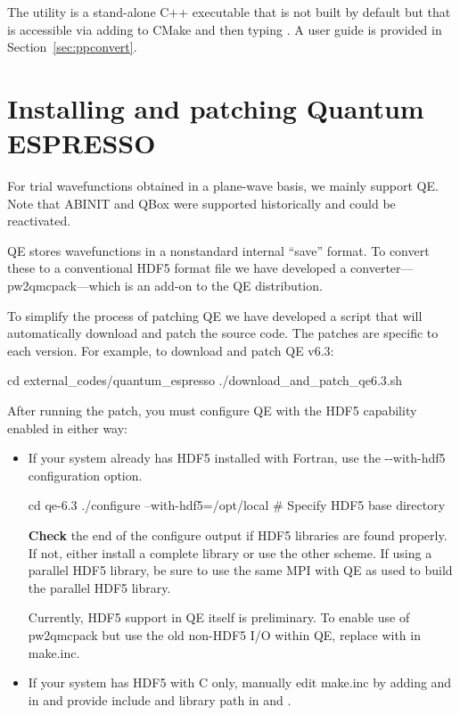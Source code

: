 The utility is a stand-alone C++ executable that is not built by default but that is accessible via adding
 to CMake and then typing .
A user guide is provided in Section~\ref{sec:ppconvert}.

\section{Installing and patching Quantum ESPRESSO}
\label{sec:buildqe}
For trial wavefunctions obtained in a plane-wave basis, we mainly
support QE. Note that ABINIT and QBox were supported historically
and could be reactivated.

QE stores wavefunctions in a nonstandard internal
``save'' format. To convert these to a conventional HDF5 format file
we have developed a converter---pw2qmcpack---which is an add-on to the
QE distribution.

To simplify the process of patching QE we have developed
a script that will automatically download and patch the source
code. The patches are specific to each version. For example, to download and
patch QE v6.3:

\begin{shade}
cd external_codes/quantum_espresso
./download_and_patch_qe6.3.sh
\end{shade}
After running the patch, you must configure QE with
the HDF5 capability enabled in either way:
\begin{itemize}
\item If your system already has HDF5 installed with Fortran, use the -{}-with-hdf5 configuration option.

\begin{shade}
cd qe-6.3
./configure --with-hdf5=/opt/local   # Specify HDF5 base directory
\end{shade}
   {\bf Check} the end of the configure output if HDF5 libraries are found properly.
   If not, either install a complete library or use the other scheme. If using a parallel HDF5 library, be sure to use
   the same MPI with QE as used to build the parallel HDF5 library.

   Currently, HDF5 support in QE itself is preliminary. To enable use of pw2qmcpack
   but use the old non-HDF5 I/O within QE, replace  with  in make.inc.
\item If your system has HDF5 with C only, manually edit make.inc by adding  and 
   in  and provide include and library path in  and .
\end{itemize}

